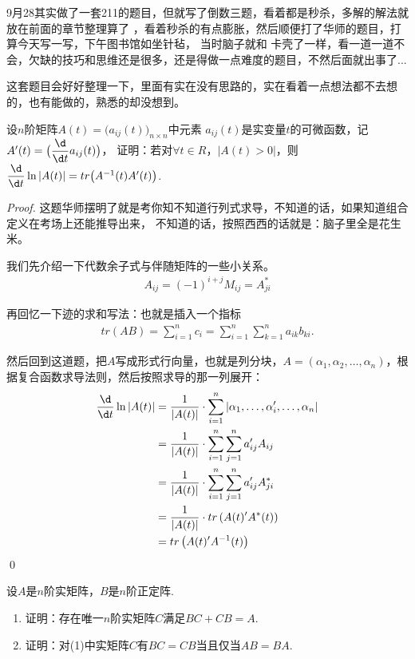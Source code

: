 9月28其实做了一套211的题目，但就写了倒数三题，看着都是秒杀，多解的解法就放在前面的章节整理算了
，看着秒杀的有点膨胀，然后顺便打了华师的题目，打算今天写一写，下午图书馆如坐针毡， 当时脑子就和
卡壳了一样，看一道一道不会，欠缺的技巧和思维还是很多，还是得做一点难度的题目，不然后面就出事了...

这套题目会好好整理一下，里面有实在没有思路的，实在看着一点想法都不去想的，也有能做的，熟悉的却没想到。

\begin{ex}[ECNU 2021]
	设$n$阶矩阵$A(t)=\bigl( a_{ij}(t) \bigr)_{n \times n}$中元素
    $a_{ij}(t)$是实变量$t$的可微函数，记$A^\prime(t) = \bigl( \dfrac{\d}{\d t} a_{ij}(t) \bigr)$，
    证明：若对$\forall t \in R$，$|A(t)>0|$，则$\dfrac{\d}{\d t} \ln |A(t)| = tr\bigl( A^{-1} (t) A^\prime(t) \bigr)$.
\end{ex}

\begin{proof}
	这题华师摆明了就是考你知不知道行列式求导，不知道的话，如果知道组合定义在考场上还能推导出来，
	不知道的话，按照西西的话就是：脑子里全是花生米。

	我们先介绍一下代数余子式与伴随矩阵的一些小关系。
	\begin{align*}
		A_{ij} = (-1)^{i+j} M_{ij} = A^\ast _{ji}
	\end{align*}

	再回忆一下迹的求和写法：也就是插入一个指标
	\begin{align*}
		tr(AB) = \sum_{i=1}^n c_i = \sum_{i=1}^n \sum_{k=1}^n a_{ik} b_{k i}.
	\end{align*}

	然后回到这道题，把$A$写成形式行向量，也就是列分块，$A=(\alpha_1,\alpha_2,\dots,
	\alpha_n)$，根据复合函数求导法则，然后按照求导的那一列展开：
	\begin{align*}
		\dfrac{\d}{\d t} \ln |A(t)| &= \dfrac{1}{| A(t) |} \cdot 
		\sum_{i=1}^n  | \alpha_1, \dots, \alpha_i^\prime , \dots,\alpha_n | \\
		&= \dfrac{1}{| A(t) |} \cdot \sum_{i=1}^n \sum_{j=1}^n 
		a_{ij}^\prime A_{ij} \\
		&= \dfrac{1}{| A(t) |} \cdot \sum_{i=1}^n \sum_{j=1}^n 
		a_{ij}^\prime A^\ast_{ji} \\
		&= \dfrac{1}{| A(t) |} \cdot tr\left(A(t)^\prime A^\ast(t)\right) \\
		&= tr\left(A(t)^\prime A^{-1}(t)\right)
	\end{align*}
	\qed{}
\end{proof}

\begin{ex}[ECNU 2021]
	设$A$是$n$阶实矩阵，$B$是$n$阶正定阵.
	\begin{enumerate}
		\item 证明：存在唯一$n$阶实矩阵$C$满足$BC+CB=A$.
		\item 证明：对(1)中实矩阵$C$有$BC=CB$当且仅当$AB=BA$.
	\end{enumerate}
\end{ex}

